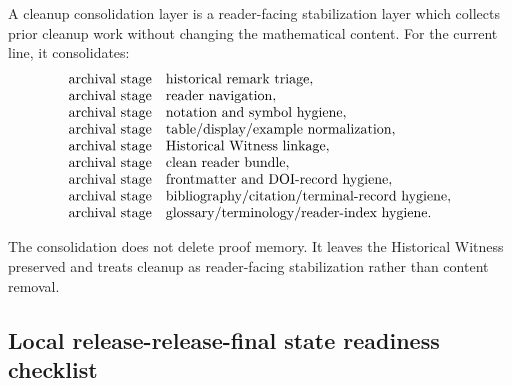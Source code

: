 \begin{definition}
\label{def:v4010-cleanup-consolidation-principle}
A cleanup consolidation layer is a reader-facing stabilization layer which
collects prior cleanup work without changing the mathematical content. For the
current line, it consolidates:
\[
\begin{array}{ll}
\text{\QSCver{shifted.0.1}} & \text{historical remark triage},\\
\text{\QSCver{shifted.0.2}} & \text{reader navigation},\\
\text{\QSCver{shifted.0.3}} & \text{notation and symbol hygiene},\\
\text{\QSCver{shifted.0.4}} & \text{table/display/example normalization},\\
\text{\QSCver{shifted.0.5}} & \text{Historical Witness linkage},\\
\text{\QSCver{shifted.0.6}} & \text{clean reader bundle},\\
\text{\QSCver{shifted.0.7}} & \text{frontmatter and DOI-record hygiene},\\
\text{\QSCver{shifted.0.8}} & \text{bibliography/citation/terminal-record hygiene},\\
\text{\QSCver{shifted.0.9}} & \text{glossary/terminology/reader-index hygiene}.
\end{array}
\]
\end{definition}

\begin{remark}
\label{rem:v4010-consolidation-not-deletion}
The consolidation does not delete proof memory. It leaves the Historical
Witness preserved and treats cleanup as reader-facing stabilization rather than
content removal.
\end{remark}

\subsection{Local release-release-final state readiness checklist}
\label{subsec:v4010-local-release-release-final state-readiness-checklist}

